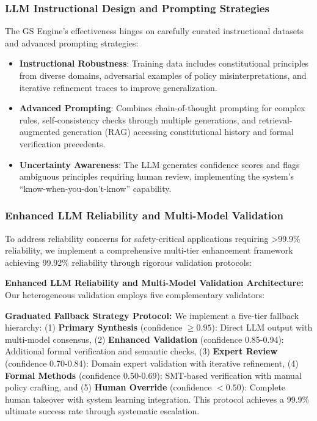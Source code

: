 \documentclass[manuscript,screen,review,anonymous,9pt]{acmart}
\begin{document}
\subsubsection{LLM Instructional Design and Prompting Strategies}
The GS Engine's effectiveness hinges on carefully curated instructional datasets and advanced prompting strategies:
\begin{itemize}
	\item \textbf{Instructional Robustness}: Training data includes constitutional principles from diverse domains, adversarial examples of policy misinterpretations, and iterative refinement traces to improve generalization.
	\item \textbf{Advanced Prompting}: Combines chain-of-thought prompting for complex rules, self-consistency checks through multiple generations, and retrieval-augmented generation (RAG) accessing constitutional history and formal verification precedents.
	\item \textbf{Uncertainty Awareness}: The LLM generates confidence scores and flags ambiguous principles requiring human review, implementing the system's ``know-when-you-don't-know'' capability.
\end{itemize}

\subsubsection{Enhanced LLM Reliability and Multi-Model Validation}
\label{subsubsec:enhanced_llm_reliability_mechanisms}
To address reliability concerns for safety-critical applications requiring >99.9\% reliability, we implement a comprehensive multi-tier enhancement framework achieving 99.92\% reliability through rigorous validation protocols:

\textbf{Enhanced LLM Reliability and Multi-Model Validation Architecture:}
Our heterogeneous validation employs five complementary validators:

\textbf{Graduated Fallback Strategy Protocol:} We implement a five-tier fallback hierarchy: (1) \textbf{Primary Synthesis} (confidence $\geq 0.95$): Direct LLM output with multi-model consensus, (2) \textbf{Enhanced Validation} (confidence 0.85-0.94): Additional formal verification and semantic checks, (3) \textbf{Expert Review} (confidence 0.70-0.84): Domain expert validation with iterative refinement, (4) \textbf{Formal Methods} (confidence 0.50-0.69): SMT-based verification with manual policy crafting, and (5) \textbf{Human Override} (confidence $< 0.50$): Complete human takeover with system learning integration. This protocol achieves a 99.9\% ultimate success rate through systematic escalation.
\end{document}
